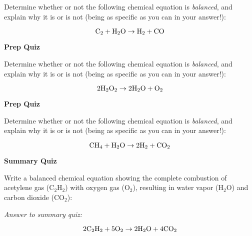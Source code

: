 Determine whether or not the following chemical equation is {\it balanced}, and explain why it is or is not (being as specific as you can in your answer!):

$$\hbox{C}_2 + \hbox{H}_2\hbox{O} \to \hbox{H}_2 + \hbox{CO}$$








\vfil \eject

\noindent
{\bf Prep Quiz}

Determine whether or not the following chemical equation is {\it balanced}, and explain why it is or is not (being as specific as you can in your answer!):

$$2\hbox{H}_2\hbox{O}_2 \to 2\hbox{H}_2\hbox{O} + \hbox{O}_2$$









\vfil \eject

\noindent
{\bf Prep Quiz}

Determine whether or not the following chemical equation is {\it balanced}, and explain why it is or is not (being as specific as you can in your answer!):

$$\hbox{CH}_4 + \hbox{H}_2\hbox{O} \to 2\hbox{H}_2 + \hbox{CO}_2$$











\vfil \eject

\noindent
{\bf Summary Quiz}

Write a balanced chemical equation showing the complete combustion of acetylene gas (C$_{2}$H$_{2}$) with oxygen gas (O$_{2}$), resulting in water vapor (H$_{2}$O) and carbon dioxide (CO$_{2}$):

\vfil \eject

{\it Answer to summary quiz:}

$$2\hbox{C}_2\hbox{H}_2 + 5\hbox{O}_2 \to 2\hbox{H}_2\hbox{O} + 4\hbox{CO}_2$$






